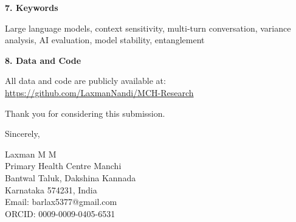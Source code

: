 \documentclass[11pt]{article}
\begin{document}
\vspace{1em}

\noindent \textbf{7. Keywords}

Large language models, context sensitivity, multi-turn conversation, variance analysis, AI evaluation, model stability, entanglement

\vspace{1em}

\noindent \textbf{8. Data and Code}

All data and code are publicly available at: \url{https://github.com/LaxmanNandi/MCH-Research}

\vspace{2em}

\noindent Thank you for considering this submission.

\vspace{1em}

\noindent Sincerely,

\vspace{1em}

\noindent Laxman M M\\
Primary Health Centre Manchi\\
Bantwal Taluk, Dakshina Kannada\\
Karnataka 574231, India\\
Email: barlax5377@gmail.com\\
ORCID: 0009-0009-0405-6531
\end{document}

